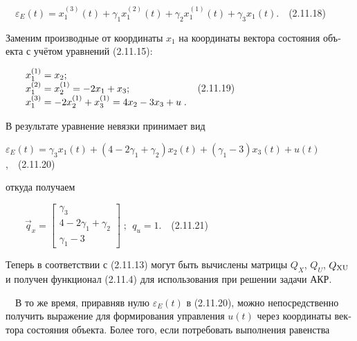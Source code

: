 \documentclass[a4paper]{article}
\newcommand\normalsubformula[1]{\text{\mathversion{normal}$#1$}}
\begin{document}
{\begin{russian}\sffamily
\ \  $ε_E(t)=x_1^{(3)}(t)+γ_1x_1^{(2)}(t)+γ_2x_1^{(1)}(t)+γ_3x_1(t)$.\ \ (2.11.18)
\end{russian}}

{\begin{russian}\sffamily
Заменим производные от координаты  $x_1$ на координаты вектора состояния объекта с учётом уравнений (2.11.15):
\end{russian}}

{\begin{russian}\sffamily
\ \ \ \  $\begin{matrix}x_1^{(1)}=x_2;\hfill\null \\x_1^{(2)}=x_2^{(1)}=-2x_1+x_3;\hfill\null
\\x_1^{(3)}=-2x_2^{(1)}+x_3^{(1)}=4x_2-3x_3+u\;.\hfill\null \end{matrix}\hfill $\ \ (2.11.19)
\end{russian}}

{\begin{russian}\sffamily
В результате уравнение невязки принимает вид
\end{russian}}

{\begin{russian}\sffamily
 $ε_E(t)=γ_3x_1(t)+(4-2γ_1+γ_2)x_2(t)+(γ_1-3)x_3(t)+u(t)$,\ \ (2.11.20)
\end{russian}}

{\begin{russian}\sffamily
откуда получаем
\end{russian}}

{\begin{russian}\sffamily
\ \ \ \  $\vec q_x=\left[\begin{matrix}γ_3\\4-2γ_1+γ_2\\γ_1-3\end{matrix}\right]\;;\ \ q_u=1$.\ \ (2.11.21)
\end{russian}}

{\begin{russian}\sffamily
Теперь в соответствии с (2.11.13) могут быть вычислены матрицы  $Q_X$,  $Q_U$,  $Q_{\normalsubformula{\text{XU}}}$ и
получен функционал (2.11.4) для использования при решении задачи АКР.
\end{russian}}

{\begin{russian}\sffamily
\ \ В то же время, приравняв нулю  $ε_E(t)$ в (2.11.20), можно непосредственно получить выражение для формирования
управления  $u(t)$ через координаты вектора состояния объекта. Более того, если потребовать выполнения равенства
\end{russian}}
\end{document}
